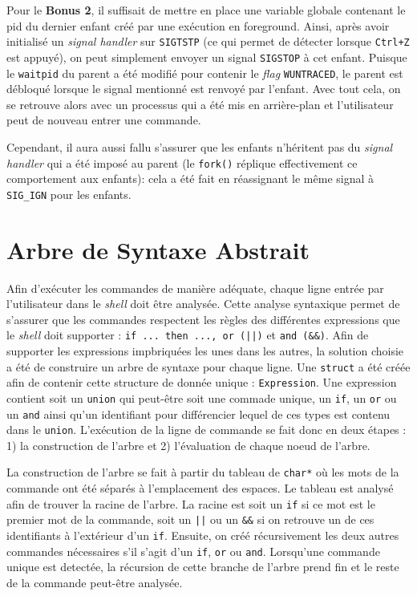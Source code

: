 \documentclass{article}
\begin{document}
Pour le \textbf{Bonus 2}, il suffisait de mettre en place une variable globale contenant le pid du dernier enfant créé par une exécution en foreground. Ainsi, après avoir initialisé un \textit{signal handler} sur \texttt{SIGTSTP} (ce qui permet de détecter lorsque \texttt{Ctrl+Z} est appuyé), on peut simplement envoyer un signal \texttt{SIGSTOP} à cet enfant. Puisque le \texttt{waitpid} du parent a été modifié pour contenir le \textit{flag} \texttt{WUNTRACED}, le parent est débloqué lorsque le signal mentionné est renvoyé par l'enfant. Avec tout cela, on se retrouve alors avec un processus qui a été mis en arrière-plan et l'utilisateur peut de nouveau entrer une commande.

Cependant, il aura aussi fallu s'assurer que les enfants n'héritent pas du \textit{signal handler} qui a été imposé au parent (le \texttt{fork()} réplique effectivement ce comportement aux enfants): cela a été fait en réassignant le même signal à \texttt{SIG\_IGN} pour les enfants.\newline

\section{Arbre de Syntaxe Abstrait}

Afin d'exécuter les commandes de manière adéquate, chaque ligne entrée par l'utilisateur dans le \textit{shell} doit être analysée. Cette analyse syntaxique permet de s'assurer que les commandes respectent les règles des différentes expressions que le \textit{shell} doit supporter : \texttt{if ... then ..., or (||)} et \texttt{and (\&\&)}. Afin de supporter les expressions impbriquées les unes dans les autres, la solution choisie a été de construire un arbre de syntaxe pour chaque ligne. Une \texttt{struct} a été créée afin de contenir cette structure de donnée unique : \texttt{Expression}. Une expression contient soit un \texttt{union} qui peut-être soit une commade unique, un \texttt{if}, un \texttt{or} ou un \texttt{and} ainsi qu'un identifiant pour différencier lequel de ces types est contenu dans le \texttt{union}. L'exécution de la ligne de commande se fait donc en deux étapes : 1) la construction de l'arbre et 2) l'évaluation de chaque noeud de l'arbre.\newline

La construction de l'arbre se fait à partir du tableau de \texttt{char*} où les mots de la commande ont été séparés à l'emplacement des espaces. Le tableau est analysé afin de trouver la racine de l'arbre. La racine est soit un \texttt{if} si ce mot est le premier mot de la commande, soit un \texttt{||} ou un \texttt{\&\&} si on retrouve un de ces identifiants à l'extérieur d'un \texttt{if}. Ensuite, on créé récursivement les deux autres commandes nécessaires s'il s'agit d'un \texttt{if}, \texttt{or} ou \texttt{and}. Lorsqu'une commande unique est detectée, la récursion de cette branche de l'arbre prend fin et le reste de la commande peut-être analysée.\newline
\end{document}
